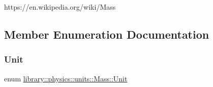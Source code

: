 https\+://en.wikipedia.\+org/wiki/\+Mass 

\subsection{Member Enumeration Documentation}
\mbox{\label{classlibrary_1_1physics_1_1units_1_1_mass_a95f1e0434bc16794926b8e273bc2a54b}} 
\subsubsection{\texorpdfstring{Unit}{Unit}}
{\footnotesize\ttfamily enum \hyperlink{classlibrary_1_1physics_1_1units_1_1_mass_a95f1e0434bc16794926b8e273bc2a54b}{library\+::physics\+::units\+::\+Mass\+::\+Unit}\hspace{0.3cm}{\ttfamily [strong]}}

